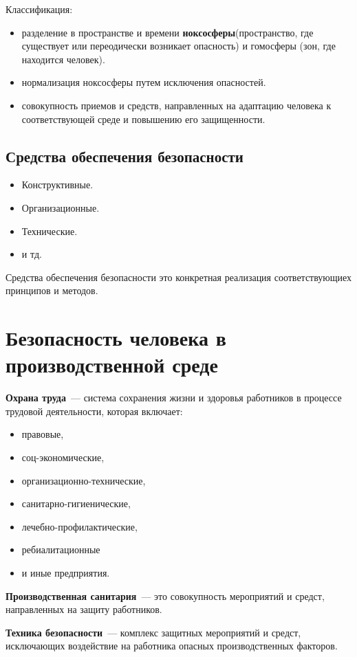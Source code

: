 Классификация:
\begin{itemize}
	\item разделение в пространстве и времени \textbf{ноксосферы}(пространство, где существует или переодически возникает опасность) и гомосферы (зон, где находится человек).
	\item нормализация ноксосферы путем исключения опасностей.
	\item совокупность приемов и средств, направленных на адаптацию человека к соответствующей среде и повышению его защищенности.
\end{itemize}

\subsection{Средства обеспечения безопасности}
\begin{itemize}
	\item Конструктивные.
	\item Организационные.
	\item Технические.
	\item и тд.
\end{itemize}

Средства обеспечения безопасности это конкретная реализация соответствующиех принципов и методов.

\section{Безопасность человека в производственной среде}
\textbf{Охрана труда}~--- система сохранения жизни и здоровья работников в процессе трудовой деятельности, которая включает:
\begin{itemize}
	\item правовые,
	\item соц-экономические,
	\item организационно-технические,
	\item санитарно-гигиенические,
	\item лечебно-профилактические,
	\item ребиалитационные
	\item и иные предприятия.
\end{itemize}

\textbf{Производственная санитария}~---  это совокупность мероприятий и средст, направленных на защиту работников.

\textbf{Техника безопасности}~--- комплекс защитных мероприятий и средст, исключающих воздействие на работника опасных производственных факторов.

